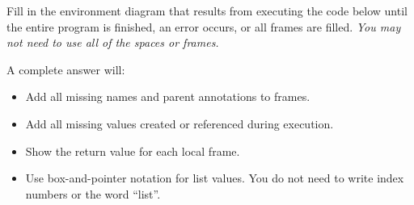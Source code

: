 
Fill in the environment diagram that results from executing the
code below until the entire program is finished, an error occurs, or all frames
are filled.  \emph{You may not need to use all of the spaces or frames.}

A complete answer will:

\begin{itemize}
    \item Add all missing names and parent annotations to frames.
    \item Add all missing values created or referenced during execution.
    \item Show the return value for each local frame.
    \item Use box-and-pointer notation for list values. You do not need to write
    index numbers or the word ``list''.
\end{itemize}

\vspace{0.3in}


\hspace{-0.7in}
